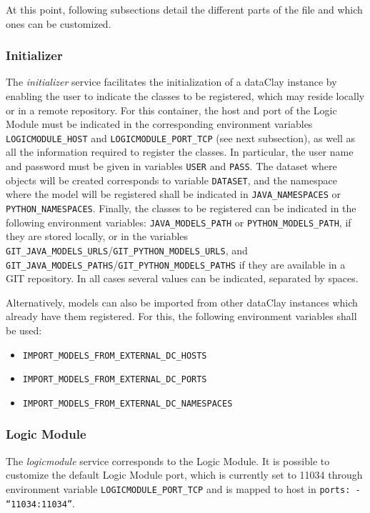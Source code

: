 At this point, following subsections detail the different parts of the file and which ones can be customized.

\subsubsection{Initializer}
The \textit{initializer} service facilitates the initialization of a dataClay instance by enabling the user to indicate the classes to be registered, which may reside locally or in a remote repository. For this container, the host and port of the Logic Module must be indicated in the corresponding environment variables \texttt{LOGICMODULE\_HOST} and \texttt{LOGICMODULE\_PORT\_TCP} (see next subsection), as well as all the information required to register the classes. In particular, the user name and password must be given in variables \texttt{USER} and \texttt{PASS}. The dataset where objects will be created corresponds to variable \texttt{DATASET}, and the namespace where the model will be registered shall be indicated in \texttt{JAVA\_NAMESPACES} or \texttt{PYTHON\_NAMESPACES}. Finally, the classes to be registered can be indicated in the following environment variables: \texttt{JAVA\_MODELS\_PATH} or \texttt{PYTHON\_MODELS\_PATH}, if they are stored locally, or in the variables \texttt{GIT\_JAVA\_MODELS\_URLS}/\texttt{GIT\_PYTHON\_MODELS\_URLS}, and \texttt{GIT\_JAVA\_MODELS\_PATHS}/\texttt{GIT\_PYTHON\_MODELS\_PATHS} if they are available in a GIT repository. In all cases several values can be indicated, separated by spaces.

Alternatively, models can also be imported from other dataClay instances which already have them registered. For this, the following environment variables shall be used: 
\begin{itemize}
   \item[] \texttt{IMPORT\_MODELS\_FROM\_EXTERNAL\_DC\_HOSTS} 
   \item[] \texttt{IMPORT\_MODELS\_FROM\_EXTERNAL\_DC\_PORTS}
   \item[] \texttt{IMPORT\_MODELS\_FROM\_EXTERNAL\_DC\_NAMESPACES}
\end{itemize}

\subsubsection{Logic Module}
The \textit{logicmodule} service corresponds to the Logic Module. It is possible to customize the default Logic Module port, which is currently set to 11034 through environment variable \texttt{LOGICMODULE\_PORT\_TCP} and is mapped to host in \texttt{ports: - ``11034:11034''}. 

